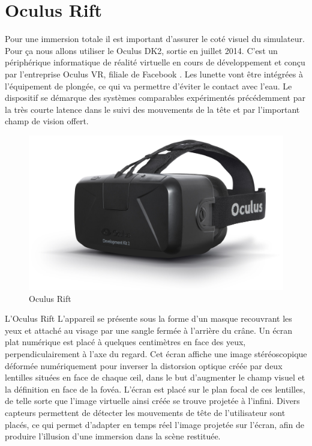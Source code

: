 \section{Oculus Rift}

Pour une immersion totale il est important d’assurer le coté visuel du simulateur. Pour ça nous allons utiliser le Oculus DK2, sortie en juillet 2014. C’est un périphérique informatique de réalité virtuelle en cours de développement et conçu par l'entreprise Oculus VR, filiale de Facebook \cite{7}. Les lunette vont être intégrées à l'équipement de plongée, ce qui va permettre d'éviter le contact avec l’eau. Le dispositif se démarque des systèmes comparables expérimentés précédemment par la très courte latence dans le suivi des mouvements de la tête et par l'important champ de vision offert.

\begin{figure}[!ht]
	\center	
	\includegraphics[scale=0.1]{image/oculus.jpg}
	\caption{Oculus Rift}
\end{figure}

L'Oculus Rift L'appareil se présente sous la forme d'un masque recouvrant les yeux et attaché au visage par une sangle fermée à l'arrière du crâne. Un écran plat numérique est placé à quelques centimètres en face des yeux, perpendiculairement à l'axe du regard. Cet écran affiche une image stéréoscopique déformée numériquement pour inverser la distorsion optique créée par deux lentilles situées en face de chaque œil, dans le but d'augmenter le champ visuel et la définition en face de la fovéa. L'écran est placé sur le plan focal de ces lentilles, de telle sorte que l'image virtuelle ainsi créée se trouve projetée à l'infini. Divers capteurs permettent de détecter les mouvements de tête de l'utilisateur sont placés, ce qui permet d'adapter en temps réel l'image projetée sur l'écran, afin de produire l'illusion d'une immersion dans la scène restituée.


